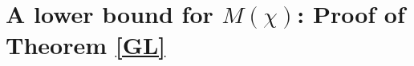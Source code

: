 \documentclass[12pt]{amsart}
\theoremstyle{definition}
\numberwithin{equation}{section}
\newcommand{\mb}{\mathbb}
\begin{document}


\section{A lower bound for $M(\chi)$: Proof of Theorem \ref{GL}}
\end{document}
